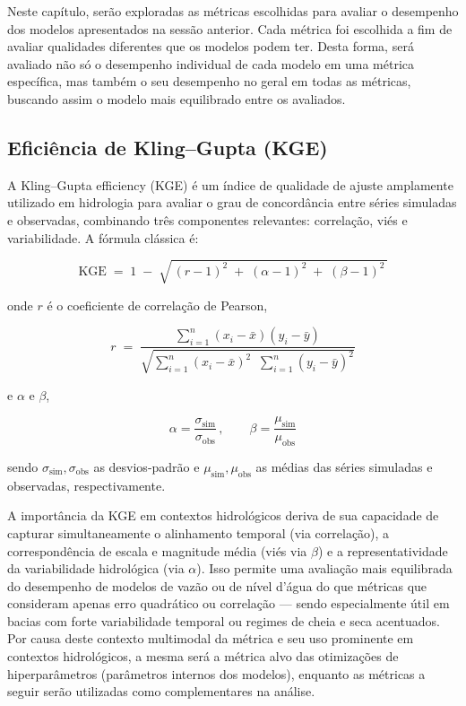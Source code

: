 Neste capítulo, serão exploradas as métricas escolhidas para avaliar o desempenho dos modelos apresentados na sessão
anterior. Cada métrica foi escolhida a fim de avaliar qualidades diferentes que os modelos podem ter. Desta forma, será
avaliado não só o desempenho individual de cada modelo em uma métrica específica, mas também o seu desempenho no geral
em todas as métricas, buscando assim o modelo mais equilibrado entre os avaliados. 

\subsection{Eficiência de Kling–Gupta (KGE)}
\label{kge}
A Kling–Gupta efficiency (KGE) \cite{kge} é um índice de qualidade de ajuste amplamente utilizado em hidrologia para
avaliar o grau de concordância entre séries simuladas e observadas, combinando três componentes relevantes: correlação,
viés e variabilidade. A fórmula clássica é:  

\[
\mathrm{KGE} \;=\; 1 \;-\; \sqrt{\,(r - 1)^{2} \;+\; (\alpha - 1)^{2} \;+\; (\beta - 1)^{2}\,}
\]

\noindent onde \(r\) é o coeficiente de correlação de Pearson,

\[
r \;=\; 
\frac{
\sum_{i=1}^{n} (x_i - \bar{x})(y_i - \bar{y})
}{
\sqrt{
\sum_{i=1}^{n} (x_i - \bar{x})^{2}
\;\;
\sum_{i=1}^{n} (y_i - \bar{y})^{2}
}
}
\]

\noindent e $\alpha$ e $\beta$,

\[
\alpha = \frac{\sigma_{\text{sim}}}{\sigma_{\text{obs}}}\,, 
\qquad 
\beta = \frac{\mu_{\text{sim}}}{\mu_{\text{obs}}}
\]

\noindent sendo \(\sigma_{\text{sim}}, \sigma_{\text{obs}}\) as desvios-padrão e \(\mu_{\text{sim}}, \mu_{\text{obs}}\)
as médias das séries simuladas e observadas, respectivamente.

A importância da KGE em contextos hidrológicos deriva de sua capacidade de capturar simultaneamente o alinhamento
temporal (via correlação), a correspondência de escala e magnitude média (viés via \(\beta\)) e a representatividade da
variabilidade hidrológica (via \(\alpha\)). Isso permite uma avaliação mais equilibrada do desempenho de modelos de
vazão ou de nível d’água do que métricas que consideram apenas erro quadrático ou correlação — sendo especialmente útil
em bacias com forte variabilidade temporal ou regimes de cheia e seca acentuados. Por causa deste contexto multimodal da
métrica e seu uso prominente em contextos hidrológicos, a mesma será a métrica alvo das otimizações de hiperparâmetros
(parâmetros internos dos modelos), enquanto as métricas a seguir serão utilizadas como complementares na análise. 

